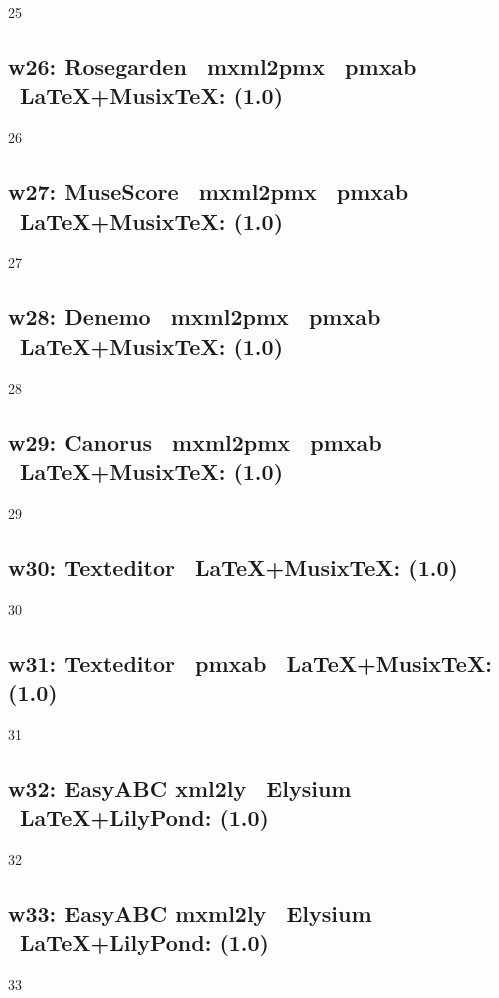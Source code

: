 25

\subsection{w26: Rosegarden \ra\ mxml2pmx \ra\ pmxab \ra\ \LaTeX+Musix\TeX: (1.0)}

26

\subsection{w27: MuseScore \ra\ mxml2pmx \ra\ pmxab \ra\ \LaTeX+Musix\TeX: (1.0)}

27

\subsection{w28: Denemo \ra\ mxml2pmx \ra\ pmxab \ra\ \LaTeX+Musix\TeX: (1.0)} 

28

\subsection{w29: Canorus \ra\ mxml2pmx \ra\ pmxab \ra\ \LaTeX+Musix\TeX: (1.0)} 

29

\subsection{w30: Texteditor \ra\ \LaTeX+Musix\TeX: (1.0)}

30

\subsection{w31: Texteditor \ra\ pmxab \ra\ \LaTeX+Musix\TeX: (1.0)}

31

\subsection{w32: Easy\-ABC \ra xml2ly \ra\ Elysium \ra\ \LaTeX+LilyPond: (1.0)} 

32

\subsection{w33: Easy\-ABC \ra mxml2ly \ra\ Elysium \ra\ \LaTeX+LilyPond: (1.0)} 

33

